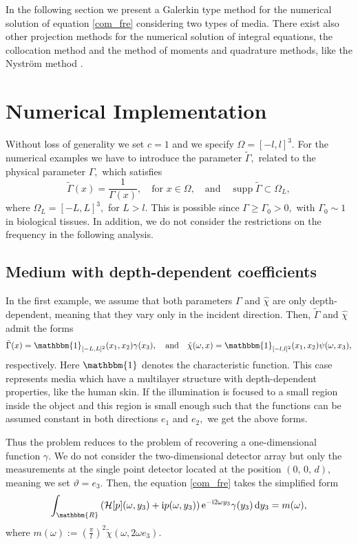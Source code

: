 \documentclass[a4paper,twoside,10pt]{article}
\theoremstyle{break}
\theoremstyle{nonumberplain}
\newcommand{\R}{\mathbbm{R}}
\newcommand{\id}{\mathbbm{1}}
\newcommand{\e}{\mathrm e}
\renewcommand{\i}{\mathrm i}
\renewcommand{\d}{\,\mathrm d}
\DeclareMathOperator{\supp}{supp}
\begin{document}
In the following section we present a Galerkin type method for the numerical solution of equation \eqref{com_fre} considering two types of media.  There exist also other projection methods for the numerical solution of integral equations, the collocation method and the method of moments and quadrature methods, like the  Nystr\"om method \cite{Hac95, Kre99, PolMan98}.



\section{Numerical Implementation}\label{section_numerics}
Without loss of generality we set $c=1$ and we specify $\Omega =[-l,l]^3 .$ 
For the numerical examples we have to introduce the parameter $\tilde{\Gamma},$ related to the physical parameter $\Gamma,$ which satisfies
\[
\tilde{\Gamma} (x) = \frac{1}{\Gamma(x)}, \quad \mbox{for } x\in \Omega, \quad \mbox{and} \quad \supp \tilde{\Gamma} \subset \Omega_L ,
\]
where $\Omega_L =[-L,L]^3,$ for $L>l.$ This is possible since $\Gamma \geq \Gamma_0 >0,$ with $\Gamma_0 \sim 1$ in biological tissues. 
In addition, we do not consider the restrictions on the frequency in the following analysis. 

\subsection{Medium with depth-dependent coefficients}\label{section_depth}
In the first example, we assume that both parameters $\Gamma$ and $\hat\chi$ are only depth-dependent, meaning that they vary only in the incident direction. 
  Then, $\tilde\Gamma$ and $\hat\chi$ admit the forms
\begin{equation*}
\tilde\Gamma (x) = \id_{[-L,L]^2} (x_1 ,x_2) \gamma (x_3)  , \quad \text{and} \quad  \hat\chi (\omega , x) = \id_{[-l,l]^2} (x_1 ,x_2) \psi (\omega ,x_3 ) ,
\end{equation*}
respectively. Here $\id$ denotes the characteristic function. This case represents media which have a multilayer structure with depth-dependent properties, like the human skin.
If the illumination is focused to a small region inside the object and this region is small enough such that the functions can be assumed constant in both directions $e_1$ and $e_2,$ we get the above forms.

Thus the problem reduces to the problem of recovering a one-dimensional function $\gamma$. We do not consider the two-dimensional detector array but only the measurements at the single point detector located at the position $(0,\,0,\,d),$ meaning we set $\vartheta = e_3. $ Then, the equation \eqref{com_fre} takes the simplified form
\begin{equation}\label{foc_fredholm}
\int_{\R} \left(\mathcal{H} [p] (\omega , y_3) + \i p (\omega , y_3) \right)  \e^{- \i 2\omega  y_3 } \gamma (y_3) \d y_3 =  m (\omega)  ,
\end{equation}
where $m (\omega) := (\tfrac{\pi}{l})^2  \tilde\chi (\omega,2 \omega e_3 ). $ 
\end{document}
